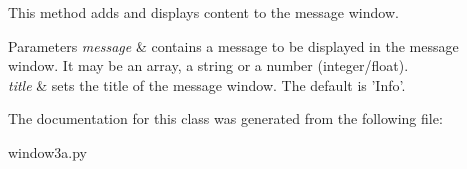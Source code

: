 This method adds and displays content to the message window. 


\begin{DoxyParams}{Parameters}
{\em message} & contains a message to be displayed in the message window. It may be an array, a string or a number (integer/float). \\
\hline
{\em title} & sets the title of the message window. The default is 'Info'. \\
\hline
\end{DoxyParams}


The documentation for this class was generated from the following file\-:\begin{DoxyCompactItemize}
\item 
window3a.\-py\end{DoxyCompactItemize}
